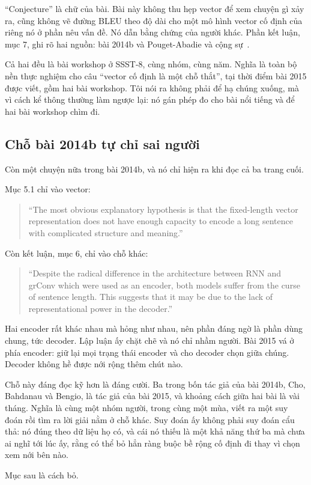 \enquote{Conjecture} là chữ của bài. Bài này không thu hẹp vector để xem chuyện
gì xảy ra, cũng không vẽ đường BLEU theo độ dài cho một mô hình vector cố định
của riêng nó ở phần nêu vấn đề. Nó dẫn bằng chứng của người khác. Phần kết
luận, mục 7, ghi rõ hai nguồn: bài 2014b và Pouget-Abadie và cộng
sự~\autocite{pougetabadie2014overcoming}.

Cả hai đều là bài workshop ở SSST-8, cùng nhóm, cùng năm. Nghĩa là toàn bộ nền
thực nghiệm cho câu \enquote{vector cố định là một chỗ thắt}, tại thời điểm bài
2015 được viết, gồm hai bài workshop. Tôi nói ra không phải để hạ chúng xuống,
mà vì cách kể thông thường làm ngược lại: nó gán phép đo cho bài nổi tiếng và
để hai bài workshop chìm đi.

\subsection*{Chỗ bài 2014b tự chỉ sai người}

%
Còn một chuyện nữa trong bài 2014b, và nó chỉ hiện ra khi đọc cả ba trang cuối.

Mục 5.1 chỉ vào vector:

\begin{quote}
\enquote{The most obvious explanatory hypothesis is that the fixed-length
vector representation does not have enough capacity to encode a long sentence
with complicated structure and meaning.}
\end{quote}

Còn kết luận, mục 6, chỉ vào chỗ khác:

\begin{quote}
\enquote{Despite the radical difference in the architecture between RNN and
grConv which were used as an encoder, both models suffer from the curse of
sentence length. This suggests that it may be due to the lack of
representational power in the decoder.}
\end{quote}

Hai encoder rất khác nhau mà hỏng như nhau, nên phần đáng ngờ là phần dùng
chung, tức decoder. Lập luận ấy chặt chẽ và nó chỉ nhầm người. Bài 2015 vá ở
phía encoder: giữ lại mọi trạng thái encoder và cho decoder chọn giữa chúng.
Decoder không hề được nới rộng thêm chút nào.

Chỗ này đáng đọc kỹ hơn là đáng cười. Ba trong bốn tác giả của bài 2014b, Cho,
Bahdanau và Bengio, là tác giả của bài 2015, và khoảng cách giữa hai bài là vài
tháng. Nghĩa là cùng một nhóm người, trong cùng một mùa, viết ra một suy đoán
rồi tìm ra lời giải nằm ở chỗ khác. Suy đoán ấy không phải suy đoán cẩu thả:
nó đúng theo dữ liệu họ có, và cái nó thiếu là một khả năng thứ ba mà chưa ai
nghĩ tới lúc ấy, rằng có thể bỏ hẳn ràng buộc bề rộng cố định đi thay vì chọn
xem nới bên nào.

Mục sau là cách bỏ.

